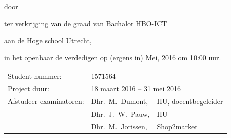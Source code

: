 \begin{titlepage}


\begin{center}


{\makeatletter
\largetitlestyle\fontsize{64}{94}\selectfont\@title
\makeatother}

{\makeatletter
\ifx\@subtitle\undefined\else
    \bigskip
   {\tudsffamily\fontsize{22}{32}\selectfont\@subtitle}    
\fi
\makeatother}

\bigskip
\bigskip

door

\bigskip
\bigskip

{\makeatletter
\largetitlestyle\fontsize{26}{26}\selectfont\@author
\makeatother}

\bigskip
\bigskip

ter verkrijging van de graad van Bachalor HBO-ICT

aan de Hoge school Utrecht,

in het openbaar de verdedigen op (ergens in) Mei, 2016 om 10:00 uur.

\vfill

\begin{tabular}{lll}
    Student nummer: & 1571564 \\
    Project duur: & \multicolumn{2}{l}{18 maart 2016 -- 31 mei 2016} \\
    Afstudeer examinatoren:
        & Dhr.\ M.\ Dumont, & HU, docentbegeleider \\
        & Dhr.\ J.\ W.\ Pauw, & HU \\
        & Dhr.\ M.\ Jorissen, & Shop2market
\end{tabular}




\end{center}


\end{titlepage}


